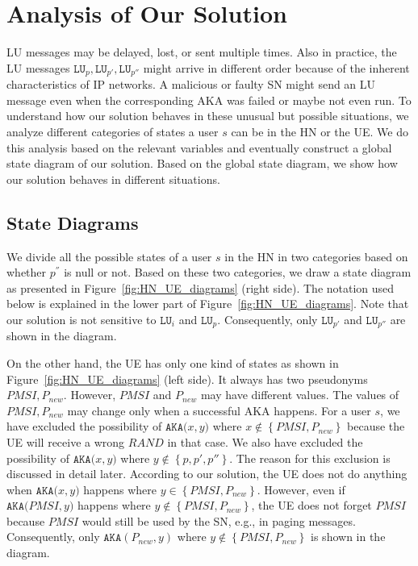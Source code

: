 \documentclass{llncs} %
\begin{document}
\section{Analysis of Our Solution} \label{sec:analysis}
LU messages may be delayed, lost, or sent multiple times. Also in practice, the LU messages $\texttt{LU}_p,\texttt{LU}_{p'},\texttt{LU}_{p''}$ might arrive in different order because of the inherent characteristics of IP networks. A malicious or faulty SN might send an LU message even when the corresponding AKA was failed or maybe not even run. To understand how our solution behaves in these unusual but possible situations, we analyze different categories of states a user $s$ can be in the HN or the UE. We do this analysis based on the relevant variables and eventually construct a global state diagram of our solution. Based on the global state diagram, we show how our solution behaves in different situations.

\subsection{State Diagrams}
We divide all the possible states of a user $s$ in the HN in two categories based on whether $p^{''}$ is null or not. Based on these two categories, we draw a state diagram as presented in Figure~\ref{fig:HN_UE_diagrams} (right side). The notation used below is explained in the lower part of Figure~\ref{fig:HN_UE_diagrams}. Note that our solution is not sensitive to $\texttt{LU}_{i}$ and $\texttt{LU}_{p}$. Consequently, only $\texttt{LU}_{p'}$ and $\texttt{LU}_{p''}$ are shown in the diagram.

On the other hand, the UE has only one kind of states as shown in Figure~\ref{fig:HN_UE_diagrams} (left side). It always has two pseudonyms $PMSI, P_{new}$. However, $PMSI$ and $P_{new}$ may have different values. The values of $PMSI,P_{new}$ may change only when a successful AKA happens. For a user $s$, we have excluded the possibility of  $\texttt{AKA($x,y$)}$ where $x \notin \left\lbrace PMSI,P_{new} \right\rbrace$ because the UE will receive a wrong $RAND$ in that case. We also have excluded the possibility of $\texttt{AKA($x,y$)}$ where $y \notin \left\lbrace p,p',p'' \right\rbrace$. The reason for this exclusion is discussed in detail later. According to our solution, the UE does not do anything when $\texttt{AKA($x,y$)}$ happens where $y \in \left\lbrace PMSI,P_{new} \right\rbrace$. However, even if $\texttt{AKA($PMSI,y$)}$ happens where $y \notin  \left\lbrace PMSI,P_{new} \right\rbrace$, the UE does not forget $PMSI$ because $PMSI$ would still be used by the SN, e.g., in paging messages. Consequently, only $\texttt{AKA}(P_{new},y)$ where $y \notin  \left\lbrace PMSI,P_{new} \right\rbrace$ is shown in the diagram.
\end{document}
